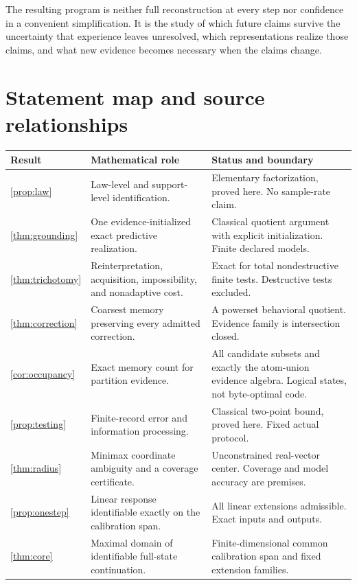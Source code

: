 \documentclass[11pt,letterpaper]{article}
\theoremstyle{plain}
\theoremstyle{definition}
\begin{document}
The resulting program is neither full reconstruction at every step nor confidence in a convenient simplification. It is the study of which future claims survive the uncertainty that experience leaves unresolved, which representations realize those claims, and what new evidence becomes necessary when the claims change.

\FloatBarrier\clearpage\appendix
\section{Statement map and source relationships}\label{app:claims}
\begin{small}\begin{longtable}{@{}P{.13\linewidth}P{.44\linewidth}P{.35\linewidth}@{}}\toprule
Result & Mathematical role & Status and boundary\\\midrule\endhead
\ref{prop:law} & Law-level and support-level identification. & Elementary factorization, proved here. No sample-rate claim.\\
\ref{thm:grounding} & One evidence-initialized exact predictive realization. & Classical quotient argument with explicit initialization. Finite declared models.\\
\ref{thm:trichotomy} & Reinterpretation, acquisition, impossibility, and nonadaptive cost. & Exact for total nondestructive finite tests. Destructive tests excluded.\\
\ref{thm:correction} & Coarsest memory preserving every admitted correction. & A powerset behavioral quotient. Evidence family is intersection closed.\\
\ref{cor:occupancy} & Exact memory count for partition evidence. & All candidate subsets and exactly the atom-union evidence algebra. Logical states, not byte-optimal code.\\
\ref{prop:testing} & Finite-record error and information processing. & Classical two-point bound, proved here. Fixed actual protocol.\\
\ref{thm:radius} & Minimax coordinate ambiguity and a coverage certificate. & Unconstrained real-vector center. Coverage and model accuracy are premises.\\
\ref{prop:onestep} & Linear response identifiable exactly on the calibration span. & All linear extensions admissible. Exact inputs and outputs.\\
\ref{thm:core} & Maximal domain of identifiable full-state continuation. & Finite-dimensional common calibration span and fixed extension families.\\

\end{longtable}
\end{small}
\end{document}
